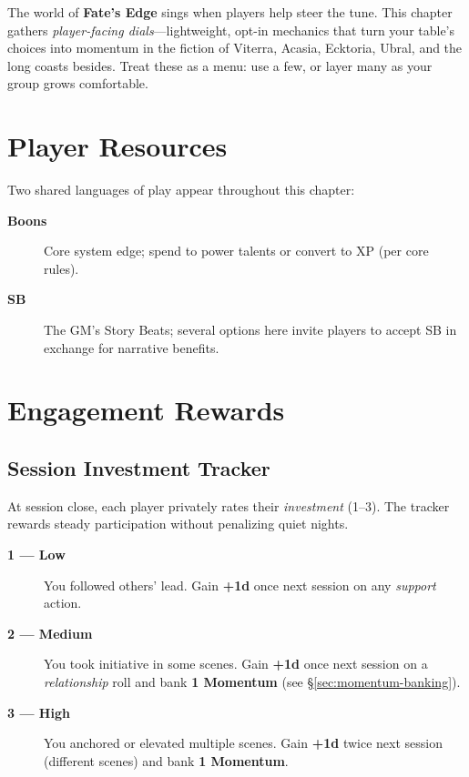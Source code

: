 The world of \textbf{Fate's Edge} sings when players help steer the tune. This chapter gathers \emph{player-facing dials}—lightweight, opt-in mechanics that turn your table's choices into momentum in the fiction of Viterra, Acasia, Ecktoria, Ubral, and the long coasts besides. Treat these as a menu: use a few, or layer many as your group grows comfortable.

\section{Player Resources}

Two shared languages of play appear throughout this chapter:
\begin{description}
  \item[\textbf{Boons}] Core system edge; spend to power talents or convert to XP (per core rules).
  \item[\textbf{SB}] The GM's Story Beats; several options here invite players to accept SB in exchange for narrative benefits.
\end{description}

\section{Engagement Rewards}

\subsection{Session Investment Tracker}
At session close, each player privately rates their \emph{investment} (1–3). The tracker rewards steady participation without penalizing quiet nights.

\begin{description}
  \item[\textbf{1 — Low}] You followed others' lead. Gain \textbf{+1d} once next session on any \emph{support} action.
  \item[\textbf{2 — Medium}] You took initiative in some scenes. Gain \textbf{+1d} once next session on a \emph{relationship} roll and bank \textbf{1 Momentum} (see \S\ref{sec:momentum-banking}).%
  \item[\textbf{3 — High}] You anchored or elevated multiple scenes. Gain \textbf{+1d} twice next session (different scenes) and bank \textbf{1 Momentum}.%
\end{description}


